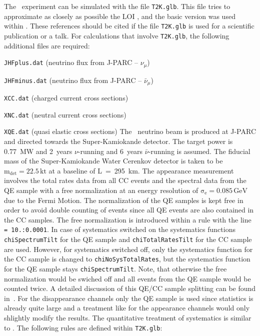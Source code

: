 The \TtoK\ experiment can be simulated with the file {\tt T2K.glb}. This file tries to approximate as closely as
possible the LOI \cite{Itow:2001ee}, and the basic version was used within \cite{Huber:2002mx}. These references
should be cited if the file {\tt T2K.glb} is used for a scientific publication or a talk. For calculations that
involve {\tt T2K.glb}, the following additional files are required: 
\bi
\item {\tt JHFplus.dat} (neutrino flux from J-PARC -- $\nu_\mu$)
\item {\tt JHFminus.dat} (neutrino flux from J-PARC -- $\bar{\nu}_\mu$)
\item {\tt XCC.dat} (charged current cross sections)
\item {\tt XNC.dat} (neutral current cross sections)
\item {\tt XQE.dat} (quasi elastic cross sections)
\ei
The \TtoK\ neutrino beam is produced at J-PARC and directed towards the Super-Kamiokande detector. The target
power is 0.77~MW and 2~years $\nu$-running and 6~years $\bar{\nu}$-running is assumed. The fiducial mass of the
Super-Kamiokande Water Cerenkov detector is taken to be $\mathrm{m_{det} = 22.5 \,kt}$ at a baseline of
L~=~295~km. The appearance measurement involves the total rates data from all CC events and the spectral data
from the QE sample with a free normalization at an energy resolution of $\mathrm{\sigma_e=0.085\, GeV}$ due to the
Fermi Motion. The normalization of the QE samples is kept free in order to avoid double counting of events since all QE
events are also contained in the CC samples. The free normalization is introduced within a rule with the line 
{\tt \@signalerror = 10.:0.0001}. In case of systematics switched on the systematics functions {\tt chiSpectrumTilt}
for the QE sample and {\tt chiTotalRatesTilt} for the CC sample are used. However, for systematics switched off, only the
systematics function for the CC sample is changed to {\tt chiNoSysTotalRates}, but the systematics function for the QE
sample stays {\tt chiSpectrumTilt}. Note, that otherwise the free normalization would be swiched off and all events from
the QE sample would be counted twice. A detailed discussion of this QE/CC sample splitting can be found in~\cite{Huber:2002mx}. 
For the disappearance channels only the QE sample is used since statistics is already quite large and a treatment like for the
appearance channels would only shlightly modify the results. The quantitative treatment of systematics is similar to \cite{Ishitsuka:2005qi}. The following rules are 
defined within {\tt T2K.glb}:  
